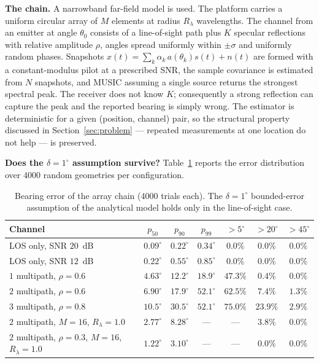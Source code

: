 \documentclass[journal,10pt]{IEEEtran}
\theoremstyle{definition}
\begin{document}
\noindent\textbf{The chain.} A narrowband far-field model is used. The platform carries a
uniform circular array of $M$ elements at radius $R_\lambda$ wavelengths. The channel from an
emitter at angle $\theta_0$ consists of a line-of-sight path plus $K$ specular reflections with
relative amplitude $\rho$, angles spread uniformly within $\pm\sigma$ and uniformly random phases.
Snapshots $x(t)=\sum_k\alpha_k\,a(\theta_k)s(t)+n(t)$ are formed with a constant-modulus pilot at
a prescribed SNR, the sample covariance is estimated from $N$ snapshots, and MUSIC assuming a
single source returns the strongest spectral peak. The receiver does not know $K$; consequently a
strong reflection can capture the peak and the reported bearing is simply wrong. The estimator is
deterministic for a given (position, channel) pair, so the structural property discussed in
Section~\ref{sec:problem} --- repeated measurements at one location do not help --- is preserved.

\noindent\textbf{Does the $\delta=1^\circ$ assumption survive?} Table~\ref{tab:rf} reports the error
distribution over $4000$ random geometries per configuration.

\begin{table}[t]
\caption{Bearing error of the array chain ($4000$ trials each). The $\delta=1^\circ$ bounded-error
assumption of the analytical model holds only in the line-of-sight case.}
\label{tab:rf}
\centering
\small
\begin{tabular}{lcccccc}
\toprule
Channel & $p_{50}$ & $p_{90}$ & $p_{99}$ & $>5^\circ$ & $>20^\circ$ & $>45^\circ$ \\
\midrule
LOS only, SNR $20$~dB                & $0.09^\circ$ & $0.22^\circ$ & $0.34^\circ$ & $0.0\%$ & $0.0\%$ & $0.0\%$ \\
LOS only, SNR $12$~dB                & $0.22^\circ$ & $0.55^\circ$ & $0.85^\circ$ & $0.0\%$ & $0.0\%$ & $0.0\%$ \\
$1$ multipath, $\rho=0.6$            & $4.63^\circ$ & $12.2^\circ$ & $18.9^\circ$ & $47.3\%$ & $0.4\%$ & $0.0\%$ \\
$2$ multipath, $\rho=0.6$            & $6.90^\circ$ & $17.9^\circ$ & $52.1^\circ$ & $62.5\%$ & $7.4\%$ & $1.3\%$ \\
$3$ multipath, $\rho=0.8$            & $10.5^\circ$ & $30.5^\circ$ & $52.1^\circ$ & $75.0\%$ & $23.9\%$ & $2.9\%$ \\
\midrule
$2$ multipath, $M{=}16$, $R_\lambda{=}1.0$ & $2.77^\circ$ & $8.28^\circ$ & --- & --- & $3.8\%$ & $0.0\%$ \\
$2$ multipath, $\rho{=}0.3$, $M{=}16$, $R_\lambda{=}1.0$ & $1.22^\circ$ & $3.10^\circ$ & --- & --- & $0.0\%$ & $0.0\%$ \\
\bottomrule
\end{tabular}
\end{table}
\end{document}
